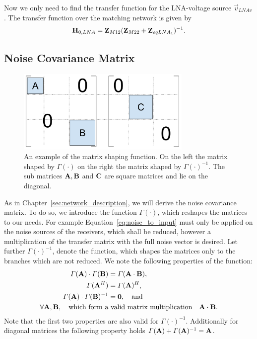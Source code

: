Now we only need to find the transfer function for the LNA-voltage source $\vec{v}_{LNAv}$.
The transfer function over the matching network is given by
\begin{align}
\label{eq:noise_to_input}
\mathbf{H}_{0,LNA} = \mathbf{Z}_{M12}(\mathbf{Z}_{M22}+\mathbf{Z}_{eqLNA_1})^{-1}.
\end{align}




\subsection{Noise Covariance Matrix}
\label{sec:sig_cov}

\begin{figure}[h]
\begin{center}
\includegraphics[width=0.75\textwidth]{images/matrix_shaping.png}
\caption{An example of the matrix shaping function. On the left the matrix shaped by $\Gamma(\cdot)$ on the right the matrix shaped by $\Gamma(\cdot)^{-1}$. The sub matrices $\mathbf{A},\mathbf{B}$ and $\mathbf{C}$ are square matrices and lie on the diagonal.}
\label{fig:twoport}
\end{center}
\end{figure}

As in Chapter~\ref{sec:network_description}, we will derive the noise covariance matrix.
To do so, we introduce the function $\Gamma(\cdot)$, which reshapes the matrices to our needs.
For example Equation~\eqref{eq:noise_to_input} must only be applied on the noise sources of the receivers, which shall be reduced, however a multiplication of the transfer matrix with the full noise vector is desired.
Let further $\Gamma(\cdot)^{-1}$, denote the function, which shapes the matrices only to the branches which are not reduced.
We note the following properties of the function:
\begin{align}
\label{eq:gamma_properties}\nonumber
\Gamma(\mathbf{A})\cdot\Gamma(\mathbf{B}) &= \Gamma(\mathbf{A}\cdot\mathbf{B}),\\\nonumber
\Gamma(\mathbf{A}^{H}) &= \Gamma(\mathbf{A})^{H},\\\nonumber
\Gamma(\mathbf{A})\cdot\Gamma(\mathbf{B})^{-1} &= \mathbf{0},\quad\text{and}\\
\forall \mathbf{A},\mathbf{B},\quad\text{which form a}&\text{ valid matrix multiplication}\quad\mathbf{A}\cdot\mathbf{B}.
\end{align}
Note that the first two properties are also valid for $\Gamma(\cdot)^{-1}$.
Additionally for diagonal matrices the following property holds $\Gamma(\mathbf{A})+\Gamma(\mathbf{A})^{-1} = \mathbf{A}$.

